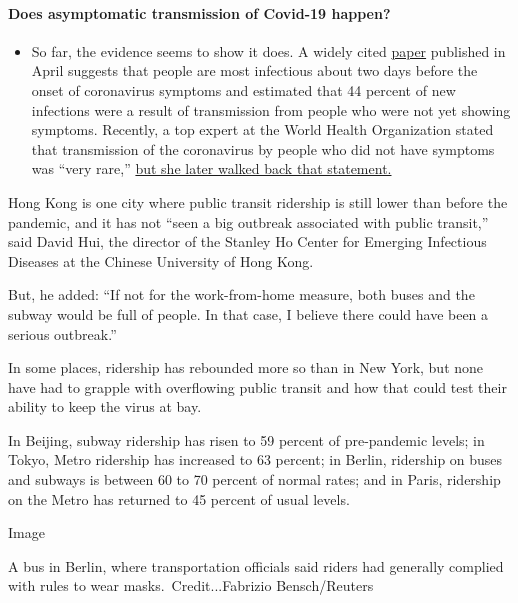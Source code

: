 \begin{itemize}
{  \paragraph{Does asymptomatic transmission of Covid-19
  happen?}\label{does-asymptomatic-transmission-of-covid-19-happen}}

  \begin{itemize}
  \tightlist
  \item
    So far, the evidence seems to show it does. A widely cited
    \href{https://www.nature.com/articles/s41591-020-0869-5}{paper}
    published in April suggests that people are most infectious about
    two days before the onset of coronavirus symptoms and estimated that
    44 percent of new infections were a result of transmission from
    people who were not yet showing symptoms. Recently, a top expert at
    the World Health Organization stated that transmission of the
    coronavirus by people who did not have symptoms was ``very rare,''
    \href{https://www.nytimes3xbfgragh.onion/2020/06/09/world/coronavirus-updates.html?action=click\&pgtype=Article\&state=default\&region=MAIN_CONTENT_3\&context=storylines_faq\#link-1f302e21}{but
    she later walked back that statement.}
  \end{itemize}
\end{itemize}

Hong Kong is one city where public transit ridership is still lower than
before the pandemic, and it has not ``seen a big outbreak associated
with public transit,'' said David Hui, the director of the Stanley Ho
Center for Emerging Infectious Diseases at the Chinese University of
Hong Kong.

But, he added: ``If not for the work-from-home measure, both buses and
the subway would be full of people. In that case, I believe there could
have been a serious outbreak.''

In some places, ridership has rebounded more so than in New York, but
none have had to grapple with overflowing public transit and how that
could test their ability to keep the virus at bay.

In Beijing, subway ridership has risen to 59 percent of pre-pandemic
levels; in Tokyo, Metro ridership has increased to 63 percent; in
Berlin, ridership on buses and subways is between 60 to 70 percent of
normal rates; and in Paris, ridership on the Metro has returned to 45
percent of usual levels.

Image

A bus in Berlin, where transportation officials said riders had
generally complied with rules to wear masks.~Credit...Fabrizio
Bensch/Reuters

